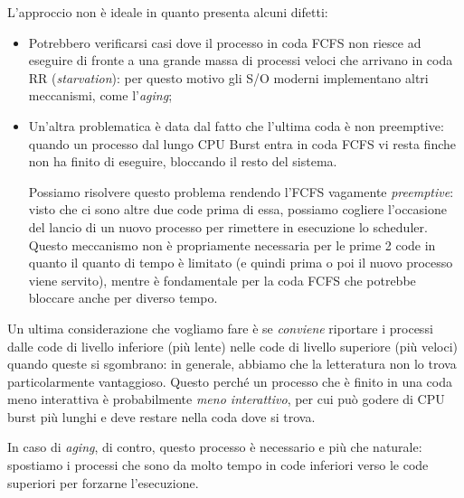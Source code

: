 \documentclass[a4paper,11pt]{article}
\begin{document}
L'approccio non è ideale in quanto presenta alcuni difetti:
\begin{itemize}
	\item 
Potrebbero verificarsi casi dove il processo in coda FCFS non riesce ad eseguire di fronte a una grande massa di processi veloci che arrivano in coda RR (\textit{starvation}): per questo motivo gli S/O moderni implementano altri meccanismi, come l'\textit{aging};
	\item
Un'altra problematica è data dal fatto che l'ultima coda è non preemptive: quando un processo dal lungo CPU Burst entra in coda FCFS vi resta finche non ha finito di eseguire, bloccando il resto del sistema. 

Possiamo risolvere questo problema rendendo l'FCFS vagamente \textit{preemptive}: visto che ci sono altre due code prima di essa, possiamo cogliere l'occasione del lancio di un nuovo processo per rimettere in esecuzione lo scheduler. Questo meccanismo non è propriamente necessaria per le prime 2 code in quanto il quanto di tempo è limitato (e quindi prima o poi il nuovo processo viene servito), mentre è fondamentale per la coda FCFS che potrebbe bloccare anche per diverso tempo.
\end{itemize}

Un ultima considerazione che vogliamo fare è se \textit{conviene} riportare i processi dalle code di livello inferiore (più lente) nelle code di livello superiore (più veloci) quando queste si sgombrano: in generale, abbiamo che la letteratura non lo trova particolarmente vantaggioso.
Questo perché un processo che è finito in una coda meno interattiva è probabilmente \textit{meno interattivo}, per cui può godere di CPU burst più lunghi e deve restare nella coda dove si trova.

In caso di \textit{aging}, di contro, questo processo è necessario e più che naturale: spostiamo i processi che sono da molto tempo in code inferiori verso le code superiori per forzarne l'esecuzione.
\end{document}
